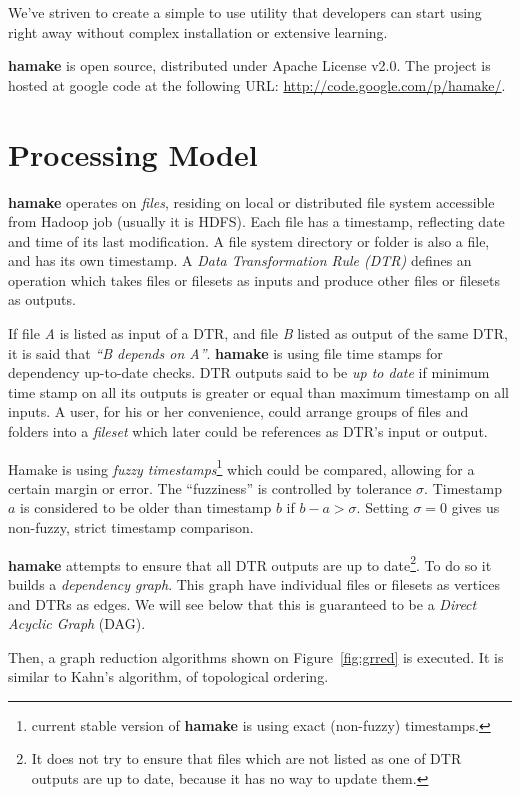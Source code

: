 \documentclass[10pt,conference,letterpaper]{IEEEtran}
\begin{document}
We've striven to create a simple to use utility that developers can
start using right away without complex installation or extensive
learning. 

\textbf{hamake} is open source, distributed under Apache
License v2.0. The project is hosted at google code at the following
URL: \url{http://code.google.com/p/hamake/}.

\section{Processing Model}

\textbf{hamake} operates on \textit{files}, residing on local or
distributed file system accessible from Hadoop job (usually it is
HDFS). Each file has a timestamp, reflecting date and time of its last
modification. A file system directory or folder is also a file, and
has its own timestamp. A \textit{Data Transformation Rule (DTR)}
defines an operation which takes files or filesets as inputs and
produce other files or filesets as outputs.

If file \textit{A} is listed as input of a DTR, and file \textit{B}
listed as output of the same DTR, it is said that \textit{``B depends
  on A''}. \textbf{hamake} is using file time stamps for dependency
up-to-date checks. DTR outputs said to be \textit{up to date} if
minimum time stamp on all its outputs is greater or equal than maximum
timestamp on all inputs. A user, for his or her convenience, could
arrange groups of files and folders into a \emph{fileset} which later
could be references as DTR's input or output.

Hamake is using \textit{fuzzy timestamps}\footnote{current stable
  version of \textbf{hamake} is using exact (non-fuzzy) timestamps.}
which could be compared, allowing for a certain margin or error. The
``fuzziness'' is controlled by tolerance $\sigma$. Timestamp $a$ is
considered to be older than timestamp $b$ if $b-a>\sigma$. Setting
$\sigma=0$ gives us non-fuzzy, strict timestamp comparison.

\textbf{hamake} attempts to ensure that all DTR outputs are up to
date\footnote{It does not try to ensure that files which are not
  listed as one of DTR outputs are up to date, because it has no way
  to update them.}.  To do so it builds a \textit{dependency
  graph}. This graph have individual files or filesets as vertices and
DTRs as edges. We will see below that this is guaranteed to be a
\textit{Direct Acyclic Graph} (DAG).

Then, a graph reduction algorithms shown on Figure~\ref{fig:grred} is
executed. It is similar to Kahn's algorithm\cite{kahn1962topological},
of topological ordering.
\end{document}
